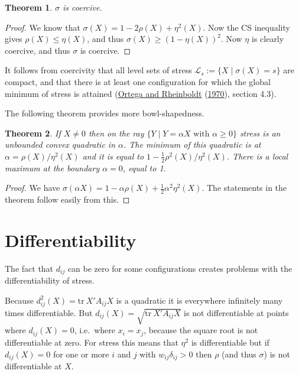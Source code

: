 \documentclass[
  12pt,
]{book}
\newtheorem{theorem}{Theorem}[chapter]
\theoremstyle{definition}
\theoremstyle{definition}
\theoremstyle{definition}
\theoremstyle{definition}
\theoremstyle{remark}
\begin{document}
\begin{theorem}
\protect\hypertarget{thm:propcoerc}{}\label{thm:propcoerc}\(\sigma\) is coercive.
\end{theorem}

\begin{proof}
We know that \(\sigma(X)=1-2\rho(X)+\eta^2(X)\). Now the CS inequality gives \(\rho(X)\leq\eta(X)\), and thus \(\sigma(X)\geq(1-\eta(X))^2\). Now \(\eta\) is
clearly coercive, and thus \(\sigma\) is coercive.
\end{proof}

It follows from coercivity that all level sets of stress \(\mathcal{L}_s:=\{X\mid \sigma(X)=s\}\) are compact, and that there is at least one configuration for which the global minimum of stress is attained (\protect\hyperlink{ref-ortega_rheinboldt_70}{Ortega and Rheinboldt} (\protect\hyperlink{ref-ortega_rheinboldt_70}{1970}), section 4.3).

The following theorem provides more bowl-shapedness.

\begin{theorem}
\protect\hypertarget{thm:rayquad}{}\label{thm:rayquad}If \(X\not=0\) then on the ray \(\{Y\mid Y=\alpha X\text{ with }\alpha\geq 0\}\) stress is an unbounded convex quadratic in \(\alpha\). The minimum of this quadratic is at \(\alpha=\rho(X)/\eta^2(X)\) and it is equal to \(1-\frac12\rho^2(X)/\eta^2(X)\). There is a local maximum at the boundary \(\alpha=0\), equal to 1.
\end{theorem}

\begin{proof}
We have \(\sigma(\alpha X)=1-\alpha\rho(X)+\frac12\alpha^2\eta^2(X)\). The statements in the theorem follow easily from this.
\end{proof}

\hypertarget{propdiff}{%
\section{Differentiability}\label{propdiff}}

The fact that \(d_{ij}\) can be zero for some configurations creates problems with the differentiability of stress.

Because \(d_{ij}^2(X)=\text{tr}\ X'A_{ij}X\) is a
quadratic it is everywhere infinitely many times differentiable. But \(d_{ij}(X)=\sqrt{\text{tr}\ X'A_{ij}X}\) is not differentiable
at points where \(d_{ij}(X)=0\), i.e.~where \(x_i=x_j\), because the square root is not differentiable at zero. For stress this means that \(\eta^2\) is differentiable but if \(d_{ij}(X)=0\) for one or more \(i\) and \(j\) with \(w_{ij}\delta_{ij}>0\) then \(\rho\) (and thus \(\sigma\)) is not differentiable at \(X\).
\end{document}
